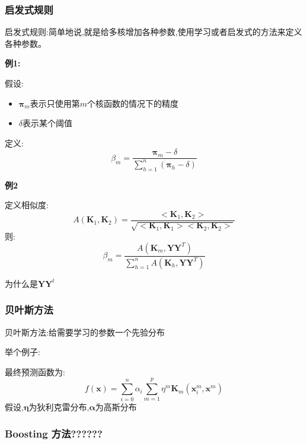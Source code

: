 \documentclass[UTF8,a4paper]{ctexart}
\begin{document}
            \subsubsection{启发式规则}
                启发式规则:简单地说,就是给多核增加各种参数,使用学习或者启发式的方法来定义各种参数。

                \textbf{例1:}

                假设:\begin{itemize}
                    \item $\bm \pi_m$表示只使用第$m$个核函数的情况下的精度
                    \item $\delta$表示某个阈值
                \end{itemize}
                定义:
                \begin{equation}
                    \beta_m = \frac{\bm \pi_m - \delta}{\sum_{h = 1}^n(\bm \pi_h - \delta)}
                \end{equation}

                \textbf{例2}

                定义相似度:
                \begin{equation}
                    A(\bm K_1 , \bm K_2) = \frac{<\bm K_1 , \bm K_2>}{\sqrt{<\bm K_1 , \bm K_1><\bm K_2 , \bm K_2>}}
                \end{equation}
                则:
                \begin{equation}
                    \beta_m = \frac{A(\bm K_m , \bm Y \bm Y^T)}{\sum_{h = 1}^n A(\bm K_h , \bm Y\bm Y^T)}
                \end{equation}

                {\color{red}为什么是$\bm Y\bm Y^t$}

            \subsubsection{贝叶斯方法}
            贝叶斯方法:给需要学习的参数一个先验分布

            举个例子:

            最终预测函数为:
            \begin{equation}
                f(\bm x) = \sum_{i = 0}^n \alpha_i \sum_{m = 1}^p \eta^m \bm K_m(\bm x_i^m , \bm x^m)
            \end{equation}
            假设,$\bm \eta$为狄利克雷分布,$\bm \alpha$为高斯分布

            \subsubsection{Boosting 方法??????}
\end{document}
